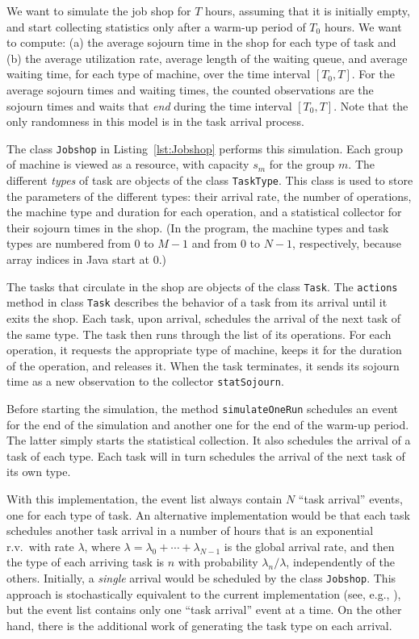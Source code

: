We want to simulate the job shop for $T$ hours,
assuming that it is initially empty, and start collecting statistics
only after a warm-up period of $T_0$ hours.
We want to compute: (a) the average sojourn time in the shop for
each type of task and
(b) the average utilization rate, average length of the waiting
queue, and average waiting time, for each type of machine,
over the time interval $[T_0,T]$.
For the average sojourn times and waiting times, the counted
observations are the sojourn times and waits that {\em end\/} during
the time interval $[T_0,T]$.
Note that the only randomness in this model is in the task
arrival process.

The class \texttt{Jobshop} in Listing~\ref{lst:Jobshop} performs this
simulation.  Each group of machine is viewed as a resource, with
capacity $s_m$ for the group $m$.
The different {\em types\/} of task are objects of the class \texttt{TaskType}.
This class is used to store the parameters of the different types:
their arrival rate, the number of operations, the machine type
and duration for each operation, and a statistical collector for
their sojourn times in the shop.
(In the program, the machine types and task types are numbered
from 0 to $M-1$ and from 0 to $N-1$, respectively,
because array indices in Java start at 0.)

The tasks that circulate in the shop are objects of the class \texttt{Task}.
The \texttt{actions} method in class \texttt{Task} describes the behavior
of a task from its arrival until it exits the shop.
Each task, upon arrival, schedules the arrival of the next task of the
same type.  The task then runs through the list of its operations.
For each operation, it requests the appropriate type of machine,
keeps it for the duration of the operation, and releases it.
When the task terminates, it sends its sojourn time as a new observation
to the collector \texttt{statSojourn}.

Before starting the simulation, the method \texttt{simulateOneRun}
schedules an event for the end of the simulation and another one
for the end of the warm-up period.  The latter simply starts the
statistical collection.
It also schedules the arrival of a task of each type.
Each task will in turn schedules the arrival of the next task of
its own type.

With this implementation, the event list always
contain $N$ ``task arrival'' events, one for each type of task.
An alternative implementation would be that each task schedules
another task arrival in a number of hours that is an exponential r.v.\
with rate $\lambda$, where $\lambda = \lambda_0 + \cdots + \lambda_{N-1}$
is the global arrival rate, and then the type of each arriving task is
$n$ with probability $\lambda_n/\lambda$, independently of the others.
Initially, a {\em single\/} arrival would be scheduled by the class
\texttt{Jobshop}.
This approach is stochastically equivalent to the current implementation
(see, e.g., \cite{sBRA87a,pWOL89a}), but the event list contains only
one ``task arrival'' event at a time.
On the other hand, there is the additional work of generating the task
type on each arrival.

